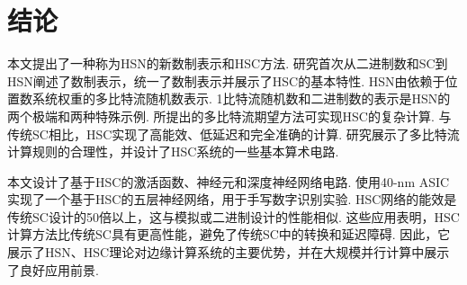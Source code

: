 \documentclass{solitairemiya-art}
\begin{document}
\section{结论}

本文提出了一种称为HSN的新数制表示和HSC方法. 研究首次从二进制数和SC到HSN阐述了数制表示，统一了数制表示并展示了HSC的基本特性. HSN由依赖于位置数系统权重的多比特流随机数表示. 1比特流随机数和二进制数的表示是HSN的两个极端和两种特殊示例. 所提出的多比特流期望方法可实现HSC的复杂计算. 与传统SC相比，HSC实现了高能效、低延迟和完全准确的计算. 研究展示了多比特流计算规则的合理性，并设计了HSC系统的一些基本算术电路. 

本文设计了基于HSC的激活函数、神经元和深度神经网络电路. 使用40-nm ASIC实现了一个基于HSC的五层神经网络，用于手写数字识别实验. HSC网络的能效是传统SC设计的50倍以上，这与模拟或二进制设计的性能相似. 这些应用表明，HSC计算方法比传统SC具有更高性能，避免了传统SC中的转换和延迟障碍. 因此，它展示了HSN、HSC理论对边缘计算系统的主要优势，并在大规模并行计算中展示了良好应用前景. 
\end{document}
